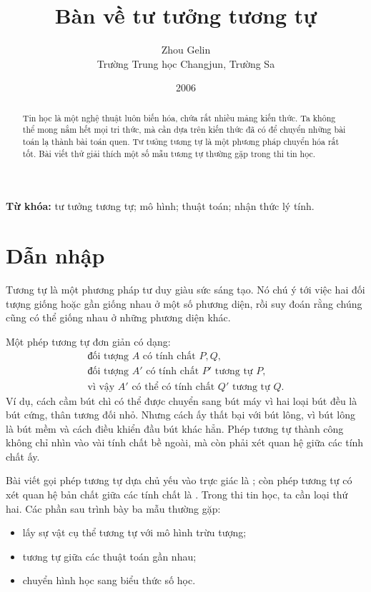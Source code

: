 \documentclass[11pt]{article}
\title{Bàn về tư tưởng tương tự}
\author{Zhou Gelin\\Trường Trung học Changjun, Trường Sa}
\date{2006}
\begin{document}
\maketitle


\renewcommand{\abstractname}{Tóm tắt}
\begin{abstract}
Tin học là một nghệ thuật luôn biến hóa, chứa rất nhiều mảng kiến thức. Ta
không thể mong nắm hết mọi tri thức, mà cần dựa trên kiến thức đã có để chuyển
những bài toán lạ thành bài toán quen. Tư tưởng tương tự là một phương pháp
chuyển hóa rất tốt. Bài viết thử giải thích một số mẫu tương tự thường gặp
trong thi tin học.
\end{abstract}

\noindent\textbf{Từ khóa:} tư tưởng tương tự; mô hình; thuật toán; nhận thức
lý tính.

\section{Dẫn nhập}

Tương tự là một phương pháp tư duy giàu sức sáng tạo. Nó chú ý tới việc hai
đối tượng giống hoặc gần giống nhau ở một số phương diện, rồi suy đoán rằng
chúng cũng có thể giống nhau ở những phương diện khác.

Một phép tương tự đơn giản có dạng:
\[
\begin{array}{l}
\text{đối tượng } A \text{ có tính chất } P,Q,\\
\text{đối tượng } A' \text{ có tính chất } P' \text{ tương tự } P,\\
\text{vì vậy } A' \text{ có thể có tính chất } Q' \text{ tương tự } Q.
\end{array}
\]
Ví dụ, cách cầm bút chì có thể được chuyển sang bút máy vì hai loại bút đều
là bút cứng, thân tương đối nhỏ. Nhưng cách ấy thất bại với bút lông, vì bút
lông là bút mềm và cách điều khiển đầu bút khác hẳn. Phép tương tự thành công
không chỉ nhìn vào vài tính chất bề ngoài, mà còn phải xét quan hệ giữa các
tính chất ấy.

Bài viết gọi phép tương tự dựa chủ yếu vào trực giác là ; còn phép tương tự có xét quan hệ bản chất giữa các tính chất là
. Trong thi tin học, ta cần loại thứ hai. Các phần sau
trình bày ba mẫu thường gặp:
\begin{itemize}
  \item lấy sự vật cụ thể tương tự với mô hình trừu tượng;
  \item tương tự giữa các thuật toán gần nhau;
  \item chuyển hình học sang biểu thức số học.
\end{itemize}
\end{document}
